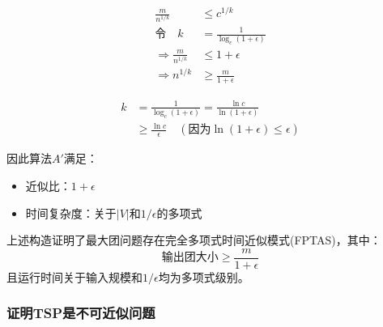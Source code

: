 \documentclass[./../main.tex]{subfiles} %
\begin{document}
\begin{align*}
\frac{m}{n^{1/k}} &\leq c^{1/k} \\
\text{令} \quad k &= \frac{1}{\log_c(1+\epsilon)} \\
\Rightarrow \frac{m}{n^{1/k}} &\leq 1 + \epsilon \\
\Rightarrow n^{1/k} &\geq \frac{m}{1 + \epsilon}
\end{align*}

\begin{align*}
k &= \frac{1}{\log_c(1+\epsilon)} = \frac{\ln c}{\ln(1+\epsilon)} \\
&\geq \frac{\ln c}{\epsilon} \quad (\text{因为} \ln(1+\epsilon) \leq \epsilon)
\end{align*}

因此算法$A'$满足：
\begin{itemize}
\item 近似比：$1 + \epsilon$
\item 时间复杂度：关于$|V|$和$1/\epsilon$的多项式
\end{itemize}

上述构造证明了最大团问题存在完全多项式时间近似模式(FPTAS)，其中：
\begin{equation*}
\text{输出团大小} \geq \frac{m}{1+\epsilon}
\end{equation*}
且运行时间关于输入规模和$1/\epsilon$均为多项式级别。

\subsubsection{证明TSP是不可近似问题}
\end{document}
